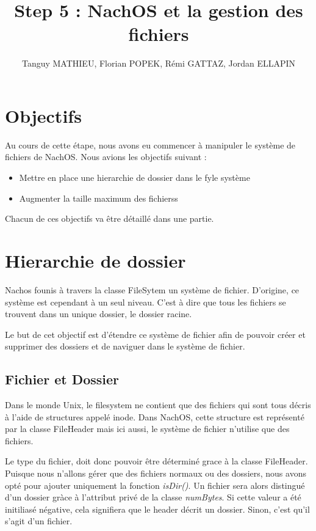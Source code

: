 \documentclass[a4paper,10pt]{article}
\title{Step 5 : NachOS et la gestion des fichiers}
\author{Tanguy MATHIEU, Florian POPEK, Rémi GATTAZ, Jordan ELLAPIN}
\begin{document}
\maketitle
\tableofcontents
\newpage

\section{Objectifs}
    Au cours de cette étape, nous avons eu commencer à manipuler le système de fichiers de NachOS.
    Nous avions les objectifs suivant :
    \begin{itemize}
        \item Mettre en place une hierarchie de dossier dans le fyle système
        \item Augmenter la taille maximum des fichierss
    \end{itemize}
    \vspace{0.8em}
    Chacun de ces objectifs va être détaillé dans une partie.


\section{Hierarchie de dossier}
    Nachos founis à travers la classe FileSytem un système de fichier. D'origine, ce système est
    cependant à un seul niveau. C'est à dire que tous les fichiers se trouvent dans un unique
    dossier, le dossier racine.

    Le but de cet objectif est d'étendre ce système de fichier afin de pouvoir créer et supprimer
    des dossiers et de naviguer dans le système de fichier.

    \subsection{Fichier et Dossier}
        Dans le monde Unix, le filesystem ne contient que des fichiers qui sont tous décris
        à l'aide de structures appelé inode. Dans NachOS, cette structure est représenté par
        la classe FileHeader mais ici aussi, le système de fichier n'utilise que des fichiers.

        Le type du fichier, doit donc pouvoir être déterminé grace à la classe FileHeader. Puisque
        nous n'allons gérer que des fichiers normaux ou des dossiers, nous avons opté pour ajouter
        uniquement la fonction \textit{isDir()}. Un fichier sera alors distingué d'un dossier gràce
        à l'attribut privé de la classe \textit{numBytes}. Si cette valeur a été initiliasé
        négative, cela signifiera que le header décrit un dossier. Sinon, c'est qu'il s'agit d'un
        fichier.
\end{document}
